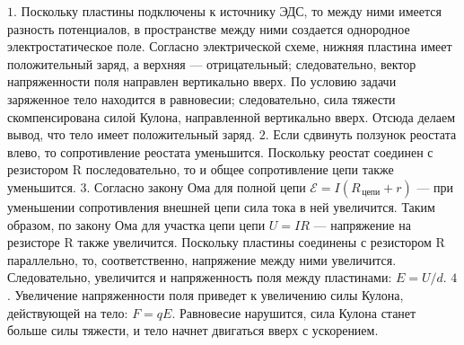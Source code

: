 \documentclass[12pt,a4paper]{article}
\begin{document}
{\begin{center}
\begin{tikzpicture}[>=stealth,line width=.6pt]
\end{tikzpicture}\end{center}
$1$.  Поскольку пластины подключены к источнику ЭДС, то между ними имеется разность потенциалов, в пространстве между ними создается однородное электростатическое поле. Согласно электрической схеме, нижняя пластина имеет положительный заряд, а верхняя  — отрицательный; следовательно, вектор напряженности поля направлен вертикально вверх. По условию задачи заряженное тело находится в равновесии; следовательно, сила тяжести скомпенсирована силой Кулона, направленной вертикально вверх. Отсюда делаем вывод, что тело имеет положительный заряд.
$2$.  Если сдвинуть ползунок реостата влево, то сопротивление реостата уменьшится. Поскольку реостат соединен с резистором R последовательно, то и общее сопротивление цепи также уменьшится. 
$3$.  Согласно закону Ома для полной цепи $\mathcal{E}=I ( R_{\,\text{цепи}} + r )$  — при уменьшении сопротивления внешней цепи сила тока в ней увеличится. Таким образом, по закону Ома для участка цепи цепи $U=IR$  — напряжение на резисторе R также увеличится. Поскольку пластины соединены с резистором R параллельно, то, соответственно, напряжение между ними увеличится. Следовательно, увеличится и напряженность поля между пластинами: $E=U/d.$
$4$.  Увеличение напряженности поля приведет к увеличению силы Кулона, действующей на тело: $F=qE.$ Равновесие нарушится, сила Кулона станет больше силы тяжести, и тело начнет двигаться вверх с ускорением.
}
\end{document}
